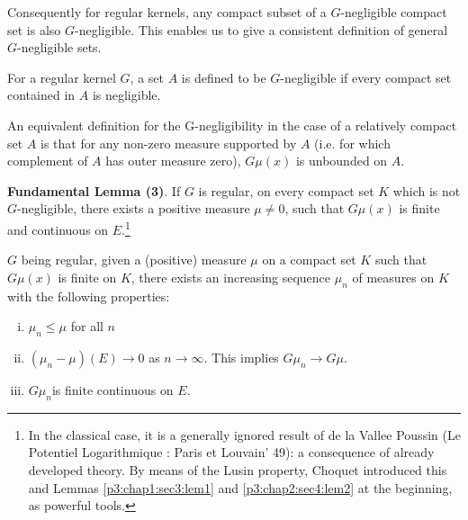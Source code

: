 Consequently for regular kernels, any compact subset of a $G$-negli\-gible
compact set is also $G$-negligi\-ble. This enables us to give a consistent
definition of general $G$-negligible sets. 

\begin{defn}\label{p3:chap2:sec4:def6}%
  For a regular kernel $G$, a set $A$ is defined to be $G$-negligible if
  every compact set contained in $A$ is negligible. 
\end{defn}

An equivalent definition for the G-negligibility in the case of a
relatively compact set $A$ is that for any non-zero measure supported
by $A $ (i.e. for which complement of $A$ has outer measure zero), $G
\mu (x)$ is unbounded on $A$. 

\noindent
\textbf{Fundamental Lemma (3)}. If $G$ is regular, on every compact
set $K$ which is not $G$-negligible, there exists a positive measure
$\mu \neq 0$, such that $G \mu (x)$ is finite and continuous on
$E$.\footnote[1]{In the classical case, it is a generally
  ignored result of de la Vallee Poussin (Le Potentiel Logarithmique :
  Paris et Louvain' 49): a consequence of already developed theory. By
  means of the Lusin property, Choquet introduced this and
  Lemmas \ref{p3:chap1:sec3:lem1} and \ref{p3:chap2:sec4:lem2}
   at the beginning, as powerful tools.}

\begin{prop}\label{p3:chap2:sec4:prop4}%
  $G$ being regular, given a (positive) measure $\mu$ on a compact set
  $K$ such that $G \mu (x)$ is finite on $K$, there exists an
  increasing sequence $\mu_n$ of measures on $K$ with the following
  properties: 
\end{prop}

\begin{enumerate}[(i)]
\item $\mu_n \le \mu$ for all $n$
\item $(\mu_n - \mu) (E) \to 0$ as $n \to \infty$. This implies $G
  \mu_n \to G \mu$.  
\item $G \mu_n$\pageoriginale is finite continuous on $E$. 
\end{enumerate}

